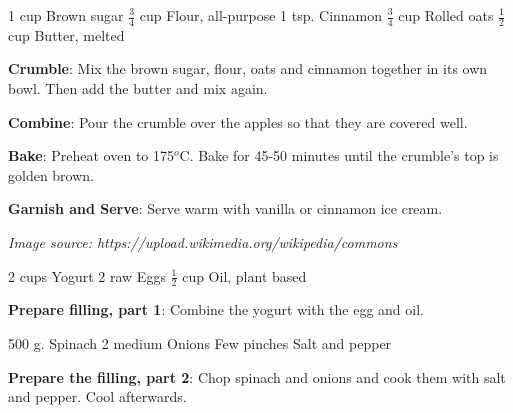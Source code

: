 \documentclass{article}
\begin{document}
\begin{step}
1 cup Brown sugar
$\frac{3}{4}$ cup Flour, all-purpose
1 tsp. Cinnamon
$\frac{3}{4}$ cup Rolled oats
$\frac{1}{2}$ cup Butter, melted

\method
\textbf{Crumble}: Mix the brown sugar, flour, oats and cinnamon together in its own bowl. Then add the butter and mix again.

\textbf{Combine}: Pour the crumble over the apples so that they are covered well.

\textbf{Bake}: Preheat oven to 175$^o$C. Bake for 45-50 minutes until the crumble's top is golden brown.

\textbf{Garnish and Serve}: Serve warm with vanilla or cinnamon ice cream.
\end{step}
\textit{Image source: https://upload.wikimedia.org/wikipedia/commons}




\dishType{\maindish}
\dishOther{\vegetarian}

\begin{step}
2 cups Yogurt
2 raw Eggs
$\frac{1}{2}$ cup Oil, plant based

\method
\textbf{Prepare filling, part 1}: Combine the yogurt with the egg and oil.
\end{step}

\begin{step}
500 g. Spinach
2 medium Onions
Few pinches Salt and pepper

\method
\textbf{Prepare the filling, part 2}: Chop spinach and onions and cook them with salt and pepper. Cool afterwards.
\end{step}
\end{document}
